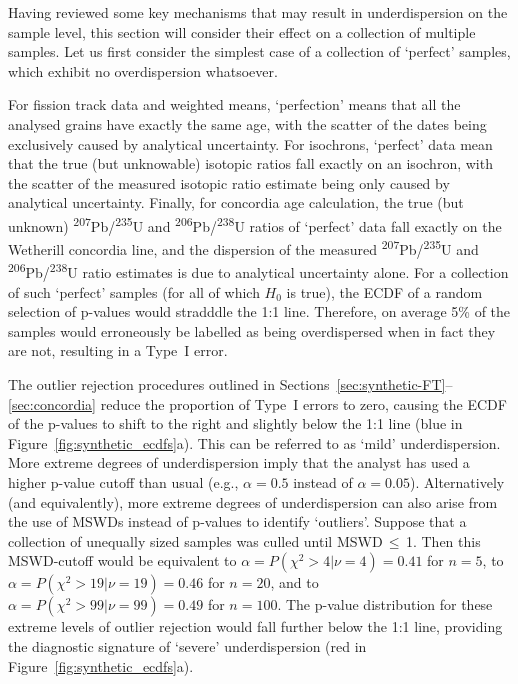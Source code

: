 \documentclass[gchron, manuscript]{copernicus}
\begin{document}
Having reviewed some key mechanisms that may result in underdispersion
on the sample level, this section will consider their effect on a
collection of multiple samples. Let us first consider the simplest
case of a collection of `perfect' samples, which exhibit no
overdispersion whatsoever.\medskip

For fission track data and weighted means, `perfection' means that all
the analysed grains have exactly the same age, with the scatter of the
dates being exclusively caused by analytical uncertainty. For
isochrons, `perfect' data mean that the true (but unknowable) isotopic
ratios fall exactly on an isochron, with the scatter of the measured
isotopic ratio estimate being only caused by analytical
uncertainty. Finally, for concordia age calculation, the true (but
unknown) \textsuperscript{207}Pb/\textsuperscript{235}U and
\textsuperscript{206}Pb/\textsuperscript{238}U ratios of `perfect'
data fall exactly on the Wetherill concordia line, and the dispersion
of the measured \textsuperscript{207}Pb/\textsuperscript{235}U and
\textsuperscript{206}Pb/\textsuperscript{238}U ratio estimates is due
to analytical uncertainty alone. For a collection of such `perfect'
samples (for all of which $H_0$ is true), the ECDF of a random
selection of p-values would stradddle the 1:1 line. Therefore, on
average 5\% of the samples would erroneously be labelled as being
overdispersed when in fact they are not, resulting in a Type~I
error.\medskip

The outlier rejection procedures outlined in
Sections~\ref{sec:synthetic-FT}--\ref{sec:concordia} reduce the
proportion of Type~I errors to zero, causing the ECDF of the p-values
to shift to the right and slightly below the 1:1 line (blue in
Figure~\ref{fig:synthetic_ecdfs}a). This can be referred to as `mild'
underdispersion. More extreme degrees of underdispersion imply that
the analyst has used a higher p-value cutoff than usual (e.g.,
$\alpha=0.5$ instead of $\alpha=0.05$). Alternatively (and
equivalently), more extreme degrees of underdispersion can also arise
from the use of MSWDs instead of p-values to identify
`outliers'. Suppose that a collection of unequally sized samples was
culled until MSWD\,$\leq$\,1. Then this MSWD-cutoff would be
equivalent to $\alpha=P(\chi^2>4|\nu=4)=0.41$ for $n=5$, to
$\alpha=P(\chi^2>19|\nu=19)=0.46$ for $n=20$, and to
$\alpha=P(\chi^2>99|\nu=99)=0.49$ for $n=100$. The p-value
distribution for these extreme levels of outlier rejection would fall
further below the 1:1 line, providing the diagnostic signature of
`severe' underdispersion (red in
Figure~\ref{fig:synthetic_ecdfs}a).\medskip
\end{document}
